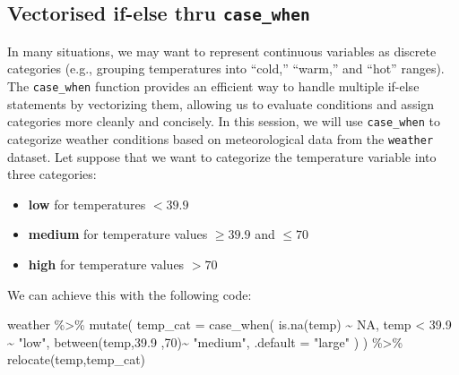 \documentclass[
  letterpaper,
  DIV=11,
  numbers=noendperiod]{scrartcl}
\newenvironment{Shaded}{\begin{snugshade}}{\end{snugshade}}
\newcommand{\AttributeTok}[1]{\textcolor[rgb]{0.40,0.45,0.13}{#1}}
\newcommand{\ConstantTok}[1]{\textcolor[rgb]{0.56,0.35,0.01}{#1}}
\newcommand{\DecValTok}[1]{\textcolor[rgb]{0.68,0.00,0.00}{#1}}
\newcommand{\FloatTok}[1]{\textcolor[rgb]{0.68,0.00,0.00}{#1}}
\newcommand{\FunctionTok}[1]{\textcolor[rgb]{0.28,0.35,0.67}{#1}}
\newcommand{\NormalTok}[1]{\textcolor[rgb]{0.00,0.23,0.31}{#1}}
\newcommand{\SpecialCharTok}[1]{\textcolor[rgb]{0.37,0.37,0.37}{#1}}
\newcommand{\StringTok}[1]{\textcolor[rgb]{0.13,0.47,0.30}{#1}}
\begin{document}
\subsection{\texorpdfstring{Vectorised if-else thru
\texttt{case\_when}}{Vectorised if-else thru case\_when}}\label{vectorised-if-else-thru-case_when}

In many situations, we may want to represent continuous variables as
discrete categories (e.g., grouping temperatures into ``cold,''
``warm,'' and ``hot'' ranges). The \texttt{case\_when} function provides
an efficient way to handle multiple if-else statements by vectorizing
them, allowing us to evaluate conditions and assign categories more
cleanly and concisely. In this session, we will use \texttt{case\_when}
to categorize weather conditions based on meteorological data from the
\texttt{weather} dataset. Let suppose that we want to categorize the
temperature variable into three categories:

\begin{itemize}
\item
  \textbf{low} for temperatures \(<39.9\)
\item
  \textbf{medium} for temperature values \(\geq 39.9\) and \(\leq 70\)
\item
  \textbf{high} for temperature values \(> 70\)
\end{itemize}

We can achieve this with the following code:

\begin{Shaded}
\begin{Highlighting}[]
\NormalTok{weather }\SpecialCharTok{\%\textgreater{}\%}
  \FunctionTok{mutate}\NormalTok{(}
    \AttributeTok{temp\_cat =} \FunctionTok{case\_when}\NormalTok{(}
      \FunctionTok{is.na}\NormalTok{(temp) }\SpecialCharTok{\textasciitilde{}} \ConstantTok{NA}\NormalTok{,}
\NormalTok{      temp }\SpecialCharTok{\textless{}} \FloatTok{39.9} \SpecialCharTok{\textasciitilde{}} \StringTok{"low"}\NormalTok{,}
      \FunctionTok{between}\NormalTok{(temp,}\FloatTok{39.9}\NormalTok{ ,}\DecValTok{70}\NormalTok{)}\SpecialCharTok{\textasciitilde{}} \StringTok{"medium"}\NormalTok{,}
      \AttributeTok{.default =} \StringTok{"large"}
\NormalTok{    )}
\NormalTok{  ) }\SpecialCharTok{\%\textgreater{}\%}
  \FunctionTok{relocate}\NormalTok{(temp,temp\_cat)}
\end{Highlighting}
\end{Shaded}
\end{document}
